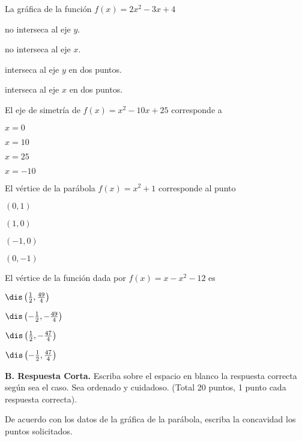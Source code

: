 \documentclass[12pt, fleqn]{article}
\begin{document}
\pagebreak

\item La gráfica de la función $f(x)=2x^2-3x+4$ \vp

\benu
\item[] \opc no interseca al eje $y$. \vp
\item[] \opc no interseca al eje $x$. \vp
\item[] \opc interseca al eje $y$ en dos puntos. \vp
\item[] \opc interseca al eje $x$ en dos puntos.
\eenu
\vp

\item El eje de simetría de $f(x)=x^2-10x+25$ corresponde a

\benu
\item[] \opc $x=0$ \vf
\item[] \opc $x=10$ \vf
\item[] \opc $x=25$ \vf
\item[] \opc $x=-10$
\eenu\vs

\item El vértice de la parábola $f(x)=x^2+1$ corresponde al punto

\benu
\item[] \opc $(0,1)$ \vf
\item[] \opc $(1,0)$ \vf
\item[] \opc $(-1,0)$ \vf
\item[] \opc $(0,-1)$
\eenu\vs

\item El vértice de la función dada por $f(x)=x-x^2-12$ es \vp

\benu
\item[] \opc $\dis\left(\frac12,\frac{49}{4}\right)$ \vf
\item[] \opc $\dis\left(-\frac12,-\frac{49}{4}\right)$ \vf
\item[] \opc $\dis\left(\frac12,-\frac{47}{4}\right)$ \vf
\item[] \opc $\dis\left(-\frac12,\frac{47}{4}\right)$
\eenu\vs

\eenu
\pagebreak


{\bf B. Respuesta Corta.} Escriba sobre el espacio en blanco la respuesta correcta según sea el caso. Sea ordenado y cuidadoso. (Total 20 puntos, 1 punto cada respuesta correcta).\vs

\benu
\item De acuerdo con los datos de la gráfica de la parábola, escriba la concavidad los puntos solicitados. \vs\vs\vs
\end{document}
